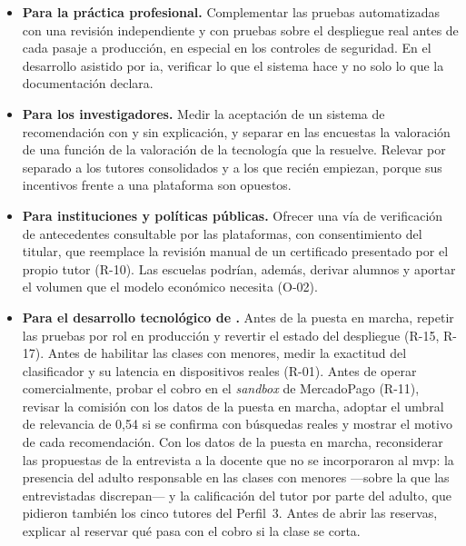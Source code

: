 \begin{itemize}
    \item \textbf{Para la práctica profesional.} Complementar las pruebas
          automatizadas con una revisión independiente y con pruebas sobre
          el despliegue real antes de cada pasaje a producción, en
          especial en los controles de seguridad. En el desarrollo
          asistido por \gls{ia}, verificar lo que el sistema hace y no solo
          lo que la documentación declara.
    \item \textbf{Para los investigadores.} Medir la aceptación de un
          sistema de recomendación con y sin explicación, y separar en las
          encuestas la valoración de una función de la valoración de la
          tecnología que la resuelve. Relevar por separado a los tutores
          consolidados y a los que recién empiezan, porque sus incentivos
          frente a una plataforma son opuestos.
    \item \textbf{Para instituciones y políticas públicas.} Ofrecer una
          vía de verificación de antecedentes consultable por las
          plataformas, con consentimiento del titular, que reemplace la
          revisión manual de un certificado presentado por el propio
          tutor (R-10). Las escuelas podrían, además, derivar alumnos y
          aportar el volumen que el modelo económico necesita (O-02).
    \item \textbf{Para el desarrollo tecnológico de \sistema{}.} Antes de la
          puesta en marcha, repetir las pruebas por rol en producción y revertir el
          estado del despliegue (R-15, R-17). Antes de habilitar las
          clases con menores, medir la exactitud del clasificador y su
          latencia en dispositivos reales (R-01). Antes de operar
          comercialmente, probar el cobro en el \emph{sandbox} de
          MercadoPago (R-11), revisar la comisión con los datos de la puesta
          en marcha, adoptar el umbral de relevancia de 0,54 si se confirma
          con búsquedas reales y mostrar el motivo de cada recomendación. Con los datos de la
          puesta en marcha, reconsiderar las propuestas de la entrevista a la docente que no se
          incorporaron al \gls{mvp}: la presencia del adulto responsable en
          las clases con menores ---sobre la que las entrevistadas
          discrepan--- y la calificación del tutor por parte del
          adulto, que pidieron también los cinco tutores del Perfil~3.
          Antes de abrir las reservas, explicar al reservar qué pasa con el
          cobro si la clase se corta.
\end{itemize}

